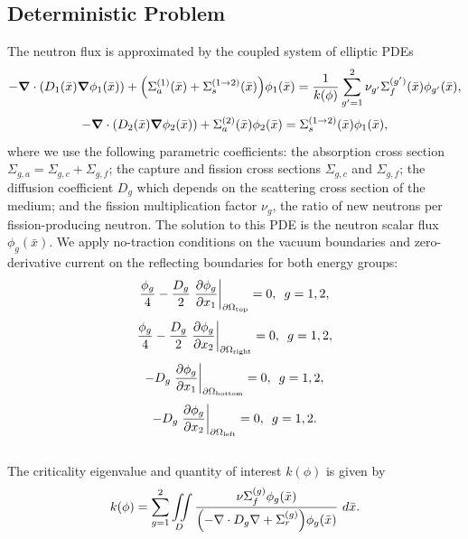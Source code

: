 \documentclass[11pt]{article}
\newcommand{\xs}[2]{\ensuremath{\Sigma_{#1}^{(#2)}}}
\begin{document}
\subsection{Deterministic Problem}
The neutron flux is approximated by the coupled system of elliptic PDEs
\begin{equation}
-\grad\cdot\qty( D_1(\bar x)\grad\phi_1(\bar x))+\qty(\xs{a}{1}(\bar x)+\xs{s}{1\to2}(\bar x))\phi_1(\bar x) = \frac{1}{k(\phi)}\sum_{g'=1}^2\nu_{g'}\xs{f}{g'}(\bar x)\phi_{g'}(\bar x),
\end{equation}
\begin{equation}
-\grad \cdot\qty(D_2(\bar x)\grad \phi_2(\bar x))+\xs{a}{2}(\bar x)\phi_2(\bar x) = \xs{s}{1\to 2}(\bar x)\phi_1(\bar x),
\end{equation}
where we use the following parametric coefficients: the absorption cross section $\Sigma_{g,a}=\Sigma_{g,c}+\Sigma_{g,f}$; the capture and fission cross sections $\Sigma_{g,c}$ and $\Sigma_{g,f}$; the diffusion coefficient $D_g$ which depends on the scattering cross section of the medium; and the fission multiplication factor $\nu_g$, the ratio of new neutrons per fission-producing neutron.  The solution to this PDE is the neutron scalar flux $\phi_g(\bar x)$.  We apply no-traction conditions on the vacuum boundaries and zero-derivative current on the reflecting boundaries for both energy groups:
 \begin{equation}
\frac{\phi_g}{4}-\frac{D_g}{2}\eval{\pdv{\phi_g}{x_1}}_{\partial \Omega_\text{top}}=0,\hspace{5pt} g=1,2,
\end{equation}
\begin{equation}
\frac{\phi_g}{4}-\frac{D_g}{2}\eval{\pdv{\phi_g}{x_2}}_{\partial \Omega_\text{right}}=0,\hspace{5pt} g=1,2,
\end{equation}
\begin{equation}
-D_g\eval{\pdv{\phi_g}{x_1}}_{\partial \Omega_\text{bottom}}=0,\hspace{5pt} g=1,2,
\end{equation}
\begin{equation}
-D_g\eval{\pdv{\phi_g}{x_2}}_{\partial \Omega_\text{left}}=0,\hspace{5pt} g=1,2.
\end{equation}
\\
The criticality eigenvalue and quantity of interest $k(\phi)$ is given by
\begin{equation}
k(\phi)=\sum_{g=1}^2\iint\limits_D\frac{\nu\xs{f}{g}\phi_g(\bar x)}{\qty(-\nabla\cdot D_g\nabla+\Sigma_r^{(g)})\phi_g(\bar x)}~d\bar x.
\end{equation}
\end{document}
